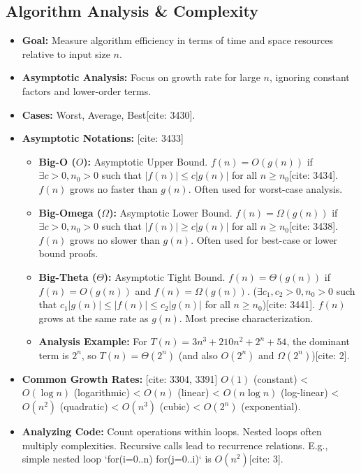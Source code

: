 \documentclass{article}
\begin{document}
\subsection{Algorithm Analysis & Complexity}
\begin{itemize}
    \item \textbf{Goal:} Measure algorithm efficiency in terms of time and space resources relative to input size $n$.
    \item \textbf{Asymptotic Analysis:} Focus on growth rate for large $n$, ignoring constant factors and lower-order terms.
    \item \textbf{Cases:} Worst, Average, Best[cite: 3430].
    \item \textbf{Asymptotic Notations:} [cite: 3433]
          \begin{itemize}
              \item \textbf{Big-O ($O$):} Asymptotic Upper Bound. $f(n) = O(g(n))$ if $\exists c > 0, n_0 > 0$ such that $|f(n)| \le c|g(n)|$ for all $n \ge n_0$[cite: 3434]. $f(n)$ grows no faster than $g(n)$. Often used for worst-case analysis.
              \item \textbf{Big-Omega ($\Omega$):} Asymptotic Lower Bound. $f(n) = \Omega(g(n))$ if $\exists c > 0, n_0 > 0$ such that $|f(n)| \ge c|g(n)|$ for all $n \ge n_0$[cite: 3438]. $f(n)$ grows no slower than $g(n)$. Often used for best-case or lower bound proofs.
              \item \textbf{Big-Theta ($\Theta$):} Asymptotic Tight Bound. $f(n) = \Theta(g(n))$ if $f(n) = O(g(n))$ and $f(n) = \Omega(g(n))$. ($ \exists c_1, c_2 > 0, n_0 > 0$ such that $c_1|g(n)| \le |f(n)| \le c_2|g(n)|$ for all $n \ge n_0$)[cite: 3441]. $f(n)$ grows at the same rate as $g(n)$. Most precise characterization.
              \item \textbf{Analysis Example:} For $T(n) = 3n^3 + 210n^2 + 2^n + 54$, the dominant term is $2^n$, so $T(n) = \Theta(2^n)$ (and also $O(2^n)$ and $\Omega(2^n)$)[cite: 2].
          \end{itemize}
    \item \textbf{Common Growth Rates:} [cite: 3304, 3391] $O(1)$ (constant) < $O(\log n)$ (logarithmic) < $O(n)$ (linear) < $O(n \log n)$ (log-linear) < $O(n^2)$ (quadratic) < $O(n^3)$ (cubic) < $O(2^n)$ (exponential).
    \item \textbf{Analyzing Code:} Count operations within loops. Nested loops often multiply complexities. Recursive calls lead to recurrence relations. E.g., simple nested loop `for(i=0..n) for(j=0..i)` is $O(n^2)$[cite: 3].
\end{itemize}
\end{document}

